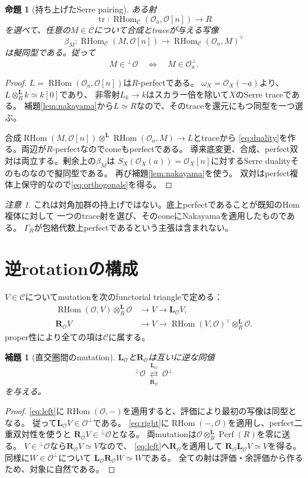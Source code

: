 \documentclass[a4paper,10pt]{ltjsarticle}
\newtheorem{proposition}[theorem]{命題}
\newtheorem{lemma}[theorem]{補題}
\theoremstyle{definition}
\theoremstyle{remark}
\newtheorem{remark}[theorem]{注意}
\newcommand{\Perf}{\operatorname{Perf}}
\newcommand{\RHom}{\operatorname{RHom}}
\newcommand{\OO}{\mathcal O}
\newcommand{\cC}{\mathcal C}
\newcommand{\otL}{\otimes^{\mathbf L}}
\newcommand{\LL}{\mathbf L}
\newcommand{\RR}{\mathbf R}
\begin{document}
\begin{proposition}[持ち上げたSerre pairing]\label{prop:trace}
ある射
\[
 \operatorname{tr}:\RHom_{\cC}(\OO_a,\OO[n])\longrightarrow R
\]
を選べて、任意の$M\in\cC$について合成とtraceが与える写像
\[
 \beta_M:\RHom_{\cC}(M,\OO[n])
 \longrightarrow\RHom_{\cC}(\OO_a,M)^\vee
 \tag{D}\label{eq:duality}
\]
は擬同型である。従って
\[
 M\in{}^\perp\OO\quad\Longleftrightarrow\quad M\in\OO_a^\perp.
 \tag{O}\label{eq:orthogonals}
\]
\end{proposition}
\begin{proof}
$L=\RHom(\OO_a,\OO[n])$は$R$-perfectである。
$\omega_X=\OO_X(-a)$より、$L\otL_Rk\simeq k[0]$であり、
非零射$L_k\to k$はスカラー倍を除いて$X$のSerre traceである。
補題\ref{lem:nakayama}から$L\simeq R$なので、そのtraceを還元にもつ同型を一つ選ぶ。

合成$\RHom(M,\OO[n])\otL\RHom(\OO_a,M)\to L$とtraceから
\eqref{eq:duality}を作る。両辺が$R$-perfectなのでconeもperfectである。
導来底変更、合成、perfect双対は両立する。剰余上の$\beta_M$は
$S_X(\OO_X(a))=\OO_X[n]$に対するSerre dualityそのものなので擬同型である。
再び補題\ref{lem:nakayama}を使う。
双対はperfect複体上保守的なので\eqref{eq:orthogonals}を得る。
\end{proof}

\begin{remark}
これは対角加群の持上げではない。底上perfectであることが既知のHom複体に対して
一つのtrace射を選び、そのconeにNakayamaを適用したものである。
$\Gamma_R$が包絡代数上perfectであるという主張は含まれない。
\end{remark}

\section{逆rotationの構成}\label{sec:rotation}
$V\in\cC$についてmutationを次のfunctorial triangleで定める：
\begin{align}
 \RHom(\OO,V)\otL_R\OO&\longrightarrow V
       \longrightarrow\LL_{\OO}V,\label{eq:left}\tag{LM}\\
 \RR_{\OO}V&\longrightarrow V
       \longrightarrow\RHom(V,\OO)^\vee\otL_R\OO.
       \label{eq:right}\tag{RM}
\end{align}
proper性により全ての項は$\cC$に属する。

\begin{lemma}[直交圏間のmutation]\label{lem:mutation}
$\LL_{\OO}$と$\RR_{\OO}$は互いに逆な同値
\[
 {}^\perp\OO\ \underset{\RR_{\OO}}{\stackrel{\LL_{\OO}}{\rightleftarrows}}\ \OO^\perp
\]
を与える。
\end{lemma}
\begin{proof}
\eqref{eq:left}に$\RHom(\OO,-)$を適用すると、評価により最初の写像は同型となる。
従って$\LL_{\OO}V\in\OO^\perp$である。
\eqref{eq:right}に$\RHom(-,\OO)$を適用し、perfect二重双対性を使うと
$\RR_{\OO}V\in{}^\perp\OO$となる。
両mutationは$\OO\otL_R\Perf(R)$を零に送る。
$V\in{}^\perp\OO$なら$\RR_{\OO}V\simeq V$なので、
\eqref{eq:left}へ$\RR_{\OO}$を適用して
$\RR_{\OO}\LL_{\OO}V\simeq V$を得る。
同様に$W\in\OO^\perp$について
$\LL_{\OO}\RR_{\OO}W\simeq W$である。
全ての射は評価・余評価から作るため、対象に自然である。
\end{proof}
\end{document}
